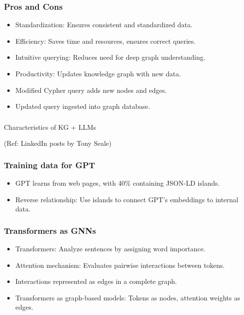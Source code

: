 \begin{frame}[fragile]\frametitle{Pros and Cons}

\begin{itemize}
\item Standardization: Ensures consistent and standardized data.
\item Efficiency: Saves time and resources, ensures correct queries.
\item Intuitive querying: Reduces need for deep graph understanding.
\item Productivity: Updates knowledge graph with new data.
\item Modified Cypher query adds new nodes and edges.
\item Updated query ingested into graph database.
\end{itemize}
\end{frame}


\begin{frame}[fragile]\frametitle{}
\begin{center}
{\Large Characteristics of KG + LLMs}

{\tiny (Ref: LinkedIn posts by Tony Seale)}
\end{center}
\end{frame}

\begin{frame}[fragile]\frametitle{Training data for GPT}

\begin{itemize}
\item GPT learns from web pages, with 40\% containing JSON-LD islands.
\item Reverse relationship: Use islands to connect GPT's embeddings to internal data.
\end{itemize}
	  
\end{frame}

\begin{frame}[fragile]\frametitle{Transformers as GNNs}

\begin{itemize}
\item Transformers: Analyze sentences by assigning word importance.
\item Attention mechanism: Evaluates pairwise interactions between tokens.
\item Interactions represented as edges in a complete graph.
\item Transformers as graph-based models: Tokens as nodes, attention weights as edges.
\end{itemize}
	  
\end{frame}


